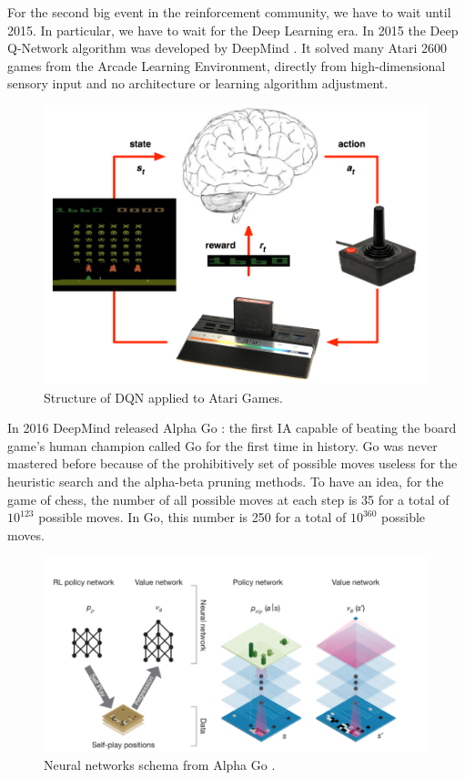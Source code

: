 For the second big event in the reinforcement community, we have to wait until 2015. 
In particular, we have to wait for the Deep Learning era.
In 2015 the Deep Q-Network algorithm was developed by DeepMind \cite{mnih2015human}. 
It solved many Atari 2600 games from the Arcade Learning Environment, directly from high-dimensional sensory input and no architecture or learning algorithm adjustment. 

\begin{figure}[H]
\centering
\includegraphics[width=.6\textwidth, height=.3\textheight]{pictures/dqn_intro}
                  \caption{ Structure of DQN applied to Atari Games.}
            \end{figure}

In 2016 DeepMind released Alpha Go \cite{silver2016mastering}: the first IA capable of beating the board game's human champion called Go for the first time in history.
Go was never mastered before because of the prohibitively set of possible moves useless for the heuristic search and the alpha-beta pruning methods.
To have an idea, for the game of chess, the number of all possible moves at each step is 35 for a total of $10^{123}$ possible moves.
In Go, this number is 250 for a total of $10^{360}$ possible moves. 

\begin{figure}[H]
\centering
\includegraphics[width=1.\textwidth, height=.3\textheight]{pictures/alpha_go}
\caption{ Neural networks schema from Alpha Go .}
            \end{figure}


